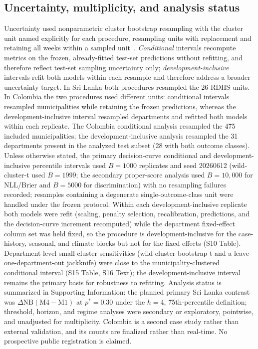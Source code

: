 \documentclass[11pt,a4paper]{article}
\begin{document}
\subsection{Uncertainty, multiplicity, and analysis status}
Uncertainty used nonparametric cluster bootstrap resampling with the cluster unit named explicitly for each procedure, resampling units with replacement and retaining all weeks within a sampled unit~\cite{CameronGelbachMiller2008}. \emph{Conditional} intervals recompute metrics on the frozen, already-fitted test-set predictions without refitting, and therefore reflect test-set sampling uncertainty only; \emph{development-inclusive} intervals refit both models within each resample and therefore address a broader uncertainty target. In Sri Lanka both procedures resampled the 26 RDHS units. In Colombia the two procedures used different units: conditional intervals resampled municipalities while retaining the frozen predictions, whereas the development-inclusive interval resampled departments and refitted both models within each replicate. The Colombia conditional analysis resampled the 475 included municipalities; the development-inclusive analysis resampled the 31 departments present in the analyzed test subset (28 with both outcome classes). Unless otherwise stated, the primary decision-curve conditional and development-inclusive percentile intervals used $B=1000$ replicates and seed 20260612 (wild-cluster-t used $B=1999$; the secondary proper-score analysis used $B=10{,}000$ for NLL/Brier and $B=5000$ for discrimination) with no resampling failures recorded; resamples containing a degenerate single-outcome-class unit were handled under the frozen protocol. Within each development-inclusive replicate both models were refit (scaling, penalty selection, recalibration, predictions, and the decision-curve increment recomputed) while the department fixed-effect column set was held fixed, so the procedure is development-inclusive for the case-history, seasonal, and climate blocks but not for the fixed effects (S10 Table). Department-level small-cluster sensitivities (wild-cluster-bootstrap-t and a leave-one-department-out jackknife) were close to the municipality-clustered conditional interval (S15 Table, S16 Text); the development-inclusive interval remains the primary basis for robustness to refitting. Analysis status is summarized in Supporting Information: the planned primary Sri Lanka contrast was $\Delta\mathrm{NB}(\text{M4}-\text{M1})$ at $p^*=0.30$ under the $h=4$, 75th-percentile definition; threshold, horizon, and regime analyses were secondary or exploratory, pointwise, and unadjusted for multiplicity. Colombia is a second case study rather than external validation, and its counts are finalized rather than real-time. No prospective public registration is claimed.
\end{document}
